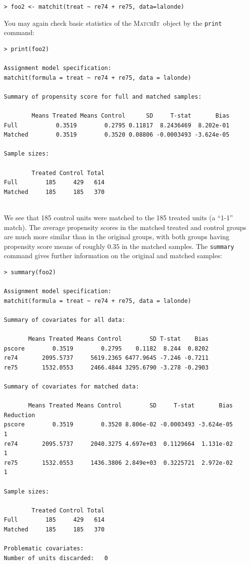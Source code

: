 \documentclass[oneside,letterpaper,titlepage]{article}
\newcommand{\MatchIt}{\textsc{MatchIt}}
\begin{document}
\begin{verbatim}
> foo2 <- matchit(treat ~ re74 + re75, data=lalonde)
\end{verbatim} 


\noindent You may again check basic statistics of the \MatchIt\ object by the
\texttt{print} command:

\begin{verbatim}
> print(foo2)
 
Assignment model specification:
matchit(formula = treat ~ re74 + re75, data = lalonde)
 
Summary of propensity score for full and matched samples:
 
        Means Treated Means Control      SD     T-stat       Bias
Full           0.3519        0.2795 0.11817  8.2436469  8.202e-01
Matched        0.3519        0.3520 0.08806 -0.0003493 -3.624e-05
 
Sample sizes:
 
        Treated Control Total
Full        185     429   614
Matched     185     185   370
 
\end{verbatim} 

We see that 185 control units were matched to the 185 treated units (a
``1-1'' match).  The average propensity scores in the matched treated
and control groups are much more similar than in the original groups,
with both groups having propensity score means of roughly $0.35$ in
the matched samples.  The {\tt summary} command gives further
information on the original and matched samples:

\begin{verbatim}
> summary(foo2)
 
Assignment model specification:
matchit(formula = treat ~ re74 + re75, data = lalonde)
 
Summary of covariates for all data:
 
       Means Treated Means Control        SD T-stat    Bias
pscore        0.3519        0.2795    0.1182  8.244  0.8202
re74       2095.5737     5619.2365 6477.9645 -7.246 -0.7211
re75       1532.0553     2466.4844 3295.6790 -3.278 -0.2903
 
Summary of covariates for matched data:
 
       Means Treated Means Control        SD     T-stat       Bias Reduction
pscore        0.3519        0.3520 8.806e-02 -0.0003493 -3.624e-05         1
re74       2095.5737     2040.3275 4.697e+03  0.1129664  1.131e-02         1
re75       1532.0553     1436.3806 2.849e+03  0.3225721  2.972e-02         1
 
Sample sizes:
 
        Treated Control Total
Full        185     429   614
Matched     185     185   370
 
Problematic covariates:
Number of units discarded:   0
\end{verbatim}
\end{document}
